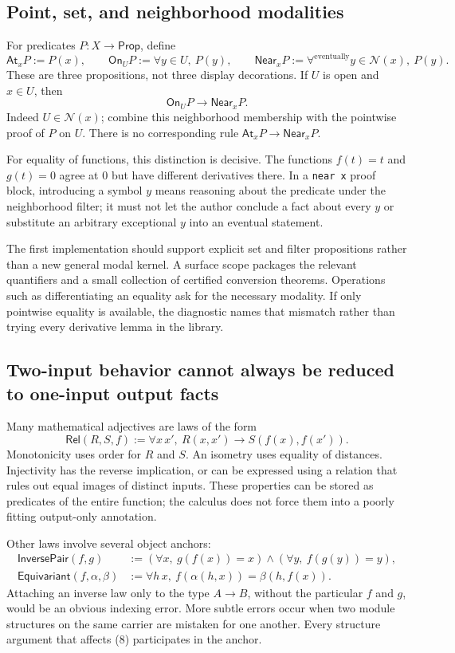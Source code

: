 \documentclass[11pt,letterpaper]{article}
\newcommand{\code}[1]{\nolinkurl{#1}}
\newcommand{\Prop}{\mathsf{Prop}}
\newcommand{\Rel}{\mathsf{Rel}}
\newcommand{\Near}{\mathsf{Near}}
\newcommand{\On}{\mathsf{On}}
\newcommand{\At}{\mathsf{At}}
\theoremstyle{definition}
\theoremstyle{remark}
\begin{document}
\subsection{Point, set, and neighborhood modalities}
For predicates $P:X\to\Prop$, define
\[
\At_x P:=P(x),\qquad
\On_U P:=\forall y\in U,\ P(y),\qquad
\Near_x P:=\forall^{\!\mathrm{eventually}}y\in\mathcal N(x),\ P(y).
\tag{5}
\]
These are three propositions, not three display decorations. If $U$ is open and
$x\in U$, then
\[
\On_U P\longrightarrow\Near_x P.
\tag{6}
\]
Indeed $U\in\mathcal N(x)$; combine this neighborhood membership with the
pointwise proof of $P$ on $U$. There is no corresponding rule
$\At_x P\to\Near_x P$.

For equality of functions, this distinction is decisive. The functions
$f(t)=t$ and $g(t)=0$ agree at $0$ but have different derivatives there. In a
\code{near x} proof block, introducing a symbol $y$ means reasoning about the
predicate under the neighborhood filter; it must not let the author conclude a
fact about every $y$ or substitute an arbitrary exceptional $y$ into an eventual
statement.

The first implementation should support explicit set and filter propositions
rather than a new general modal kernel. A surface scope packages the relevant
quantifiers and a small collection of certified conversion theorems. Operations
such as differentiating an equality ask for the necessary modality. If only
pointwise equality is available, the diagnostic names that mismatch rather than
trying every derivative lemma in the library.

\subsection{Two-input behavior cannot always be reduced to one-input output facts}
Many mathematical adjectives are laws of the form
\[
\Rel(R,S,f):=\forall x\,x',\ R(x,x')\to S(f(x),f(x')).
\tag{7}
\]
Monotonicity uses order for $R$ and $S$. An isometry uses equality of distances.
Injectivity has the reverse implication, or can be expressed using a relation
that rules out equal images of distinct inputs. These properties can be stored
as predicates of the entire function; the calculus does not force them into a
poorly fitting output-only annotation.

Other laws involve several object anchors:
\[
\begin{split}
\mathsf{InversePair}(f,g)&:=
 (\forall x,\ g(f(x))=x)\land(\forall y,\ f(g(y))=y),\\
\mathsf{Equivariant}(f,\alpha,\beta)&:=
 \forall h\,x,\ f(\alpha(h,x))=\beta(h,f(x)).
\end{split}
\tag{8}
\]
Attaching an inverse law only to the type $A\to B$, without the particular $f$
and $g$, would be an obvious indexing error. More subtle errors occur when two
module structures on the same carrier are mistaken for one another. Every
structure argument that affects (8) participates in the anchor.
\end{document}
